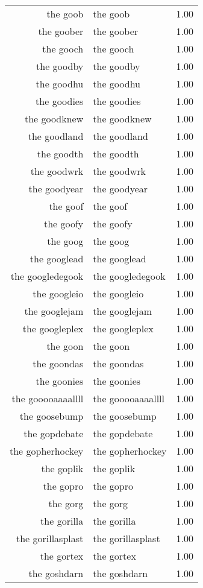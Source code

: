 \begin{table}[ht]
\begin{tabular}{rlr}
  the goob & the goob & 1.00 \\ 
  the goober & the goober & 1.00 \\ 
  the gooch & the gooch & 1.00 \\ 
  the goodby & the goodby & 1.00 \\ 
  the goodhu & the goodhu & 1.00 \\ 
  the goodies & the goodies & 1.00 \\ 
  the goodknew & the goodknew & 1.00 \\ 
  the goodland & the goodland & 1.00 \\ 
  the goodth & the goodth & 1.00 \\ 
  the goodwrk & the goodwrk & 1.00 \\ 
  the goodyear & the goodyear & 1.00 \\ 
  the goof & the goof & 1.00 \\ 
  the goofy & the goofy & 1.00 \\ 
  the goog & the goog & 1.00 \\ 
  the googlead & the googlead & 1.00 \\ 
  the googledegook & the googledegook & 1.00 \\ 
  the googleio & the googleio & 1.00 \\ 
  the googlejam & the googlejam & 1.00 \\ 
  the googleplex & the googleplex & 1.00 \\ 
  the goon & the goon & 1.00 \\ 
  the goondas & the goondas & 1.00 \\ 
  the goonies & the goonies & 1.00 \\ 
  the gooooaaaallll & the gooooaaaallll & 1.00 \\ 
  the goosebump & the goosebump & 1.00 \\ 
  the gopdebate & the gopdebate & 1.00 \\ 
  the gopherhockey & the gopherhockey & 1.00 \\ 
  the goplik & the goplik & 1.00 \\ 
  the gopro & the gopro & 1.00 \\ 
  the gorg & the gorg & 1.00 \\ 
  the gorilla & the gorilla & 1.00 \\ 
  the gorillasplast & the gorillasplast & 1.00 \\ 
  the gortex & the gortex & 1.00 \\ 
  the goshdarn & the goshdarn & 1.00 \\ 

\end{tabular}
\end{table}
